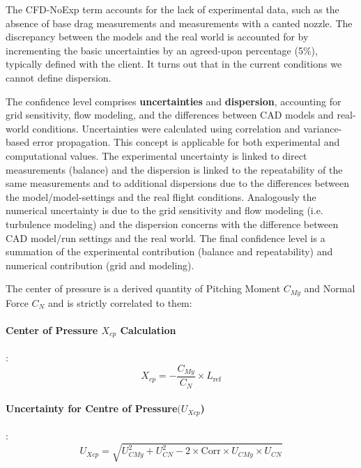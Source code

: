 \documentclass[12pt]{article}
\begin{document}
The CFD-NoExp term accounts for the lack of experimental data, such as the absence of base drag measurements and measurements with a canted nozzle. The discrepancy between the models and the real world is accounted for by incrementing the basic uncertainties by an agreed-upon percentage (5\%), typically defined with the client. It turns out that in the current conditions we cannot define dispersion. 

The confidence level comprises \textbf{uncertainties} and \textbf{dispersion}, accounting for grid sensitivity, flow modeling, and the differences between CAD models and real-world conditions. Uncertainties were calculated using correlation and variance-based error propagation. This concept is applicable for both experimental and computational values. The experimental uncertainty is linked to direct measurements (balance) and the dispersion is linked to the repeatability of the same measurements and to additional dispersions due to the differences  between the model/model-settings and the real flight conditions. Analogously the numerical uncertainty is due to the grid sensitivity and flow modeling (i.e. turbulence modeling) and the dispersion concerns with the difference between CAD model/run settings and the real world. 
The final confidence level is a summation of the experimental contribution (balance and repeatability) and numerical contribution (grid and modeling). 

The center of pressure is a derived quantity of Pitching Moment $C_{My}$ and Normal Force $C_{N}$ and is strictly correlated to them:

\paragraph{\textbf{Center of Pressure} $X_{cp}$ \textbf{Calculation}}:
%
\begin{equation}
   X_{cp} = - \frac{C_{My}}{C_{N}} \times L_{\text{ref}}
\end{equation}

\paragraph{\textbf{Uncertainty for Centre of Pressure}$(U_{Xcp}$)}:
\begin{equation}
   U_{Xcp} = \sqrt{U_{CMy}^2 + U_{CN}^2 - 2 \times \text{Corr} \times U_{CMy} \times U_{CN}}
\end{equation}
\end{document}
